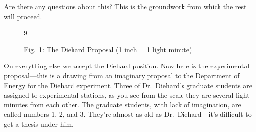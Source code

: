 \documentclass[12pt,nofootinbib]{revtex4}
\begin{document}
Are there any questions about this? This is the groundwork from which the rest will proceed.
\begin{figure}[htb] 
\begin{mdframed}
  \vspace{5pt}\hfill 9\\[-11pt]
  \begin{center}
  \end{center}
  \begin{center}
    {Fig.~1: The Diehard Proposal (1 inch = 1 light minute)}
  \end{center}
  \vspace{6pt}
\end{mdframed}
\end{figure}

On everything else we accept the Diehard position. Now here is the experimental proposal---this is a drawing from an imaginary proposal to the Department of Energy for the Diehard experiment. Three of Dr.\ Diehard's graduate students are assigned to experimental stations, as you see from the scale they are several light-minutes from each other. The graduate students, with lack of imagination, are called numbers 1, 2, and 3. They're almost as old as Dr.\ Diehard---it's difficult to get a thesis under him.
\end{document}

